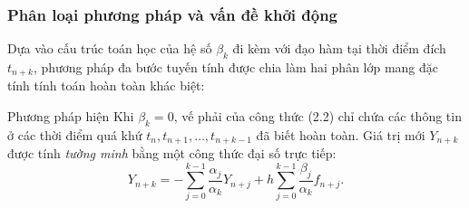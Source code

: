 
\vspace{0.5em}

\subsubsection{Phân loại phương pháp và vấn đề khởi động}

Dựa vào cấu trúc toán học của hệ số $\beta_k$ đi kèm với đạo hàm tại thời điểm đích $t_{n+k}$, phương pháp đa bước tuyến tính được chia làm hai phân lớp mang đặc tính tính toán hoàn toàn khác biệt:
    
    \begin{baitapbox}{Phương pháp hiện}
        Khi $\beta_k = 0$, vế phải của công thức (2.2) chỉ chứa các thông tin ở các thời điểm quá khứ $t_n, t_{n+1}, \dots, t_{n+k-1}$ đã biết hoàn toàn. Giá trị mới $Y_{n+k}$ được tính \textit{tường minh} bằng một công thức đại số trực tiếp:
    \[
        Y_{n+k} = -\sum_{j=0}^{k-1} \frac{\alpha_j}{\alpha_k} Y_{n+j} + h \sum_{j=0}^{k-1}  \frac{\beta_j}{\alpha_k} f_{n+j}.
    \]
    \end{baitapbox}

